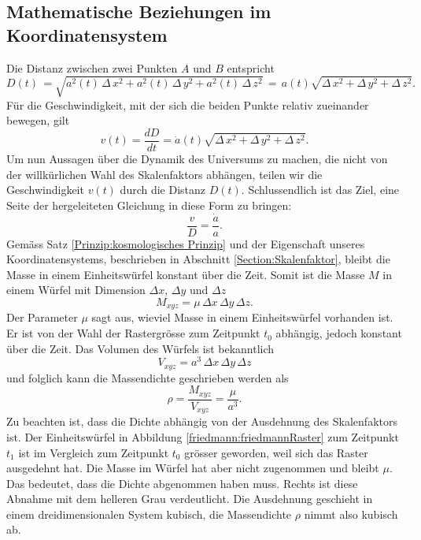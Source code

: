 \begin{refsection}
\subsection{Mathematische Beziehungen im Koordinatensystem \label{friedmann:Beziehungen im Koordinatensystem}}
Die Distanz zwischen zwei Punkten $A$ und $B$ entspricht 
\begin{equation}
D(t)\, = \sqrt{a^2(t)\,\Delta\,x^2 + a^2(t)\,\Delta\,y^2 + a^2(t)\,\Delta\,z^2}\, =\, a(t) \sqrt{\Delta\,x^2 + \Delta\,y^2 + \Delta\,z^2}.
\label{friedmann:Abstand}
\end{equation}
F\"{u}r die Geschwindigkeit, mit der sich die beiden Punkte relativ zueinander bewegen, gilt 
\begin{equation}
v(t) = \dfrac{dD}{dt} 
= \dot{a}(t) \sqrt{\Delta\,x^2 + \Delta\,y^2 + \Delta\,z^2}.
\label{friedmann:geschwindigkeit}
\end{equation}
Um nun Aussagen über die Dynamik des Universums zu machen, die nicht von der willkürlichen Wahl des Skalenfaktors abhängen, teilen wir die Geschwindigkeit $v(t)$ durch die Distanz $D(t)$. Schlussendlich ist das Ziel, eine Seite der hergeleiteten Gleichung in diese Form zu bringen:
\begin{equation}
\frac{v}{D} = \frac{\dot{a}}{a}.
\end{equation}
Gemäss Satz \ref{Prinzip:kosmologisches Prinzip} und der Eigenschaft unseres Koordinatensystems, beschrieben in Abschnitt \ref{Section:Skalenfaktor}, bleibt die Masse in einem Einheitswürfel konstant über die Zeit. Somit ist die Masse $M$ in einem Würfel mit Dimension $\Delta x$, $\Delta y$ und $\Delta z$ 
\begin{equation}
M_{xyz} = \mu \,\Delta x \,\Delta y \,\Delta z.
\end{equation}
Der Parameter $\mu$ sagt aus, wieviel Masse in einem Einheitswürfel vorhanden ist. Er ist von der Wahl der Rastergrösse zum Zeitpunkt $t_0$ abhängig, jedoch konstant über die Zeit. Das Volumen des Würfels ist bekanntlich
\begin{equation}
V_{xyz} = a^3 \,\Delta x \,\Delta y \,\Delta z
\end{equation}
und folglich kann die Massendichte geschrieben werden als
\begin{equation}
\rho = \frac{M_{xyz}}{V_{xyz}} = \frac{\mu}{a^3}.
\label{friedmann:dichte}
\end{equation}
Zu beachten ist, dass die Dichte abhängig von der Ausdehnung des Skalenfaktors ist. Der Einheitswürfel in Abbildung \ref{friedmann:friedmannRaster} zum Zeitpunkt $t_1$ ist im Vergleich zum Zeitpunkt $t_0$ grösser geworden, weil sich das Raster ausgedehnt hat. Die Masse im Würfel hat aber nicht zugenommen und bleibt $\mu$. Das bedeutet, dass die Dichte abgenommen haben muss. Rechts ist diese Abnahme mit dem helleren Grau verdeutlicht. Die Ausdehnung geschieht in einem dreidimensionalen System kubisch, die Massendichte $\rho$ nimmt also kubisch ab.


\end{refsection}
